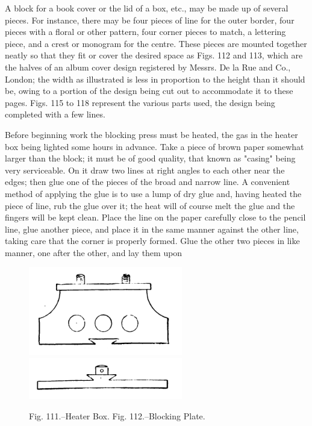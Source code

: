 \documentclass[twoside]{book}
\begin{document}
A block for a book cover or the lid of a box, etc.,
may be made up of several pieces. For instance,
there may be four pieces of line for the outer border,
four pieces with a floral or other pattern, four corner
pieces to match, a lettering piece, and a crest or
monogram for the centre. These pieces are
mounted together neatly so that they fit or cover the
desired space as Figs. 112 and 113, which are the
halves of an album cover design registered by
Messrs. De la Rue and Co., London; the width as
illustrated is less in proportion to the height than
it should be, owing to a portion of the design being
cut out to accommodate it to these pages. Figs. 115
to 118 represent the various parts used, the design
being completed with a few lines.

Before beginning work the blocking press must
be heated, the gas in the heater box being lighted
some hours in advance. Take a piece of brown
paper somewhat larger than the block; it must be
of good quality, that known as "casing" being very
\pagebreak
serviceable. On it draw two lines at right angles
to each other near the edges; then glue one of the
pieces of the broad and narrow line. A convenient
method of applying the glue is to use a lump of dry
glue and, having heated the piece of line, rub the
glue over it; the heat will of course melt the glue
and the fingers will be kept clean. Place the line
on the paper carefully close to the pencil line, glue
another piece, and place it in the same manner
against the other line, taking care that the corner
is properly formed. Glue the other two pieces in
like manner, one after the other, and lay them upon
	\begin{figure}[h]
		\centering
		\includegraphics[width=0.6\textwidth]{Figures/_111.png}
		\includegraphics[width=0.6\textwidth]{Figures/_112.png}
		\caption*{
			Fig. 111.--Heater Box.
			Fig. 112.--Blocking Plate.
         }
	\end{figure}
\end{document}

